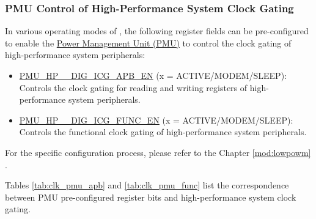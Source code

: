 \documentclass[main\_\_EN.tex]{subfiles}
\begin{document}
\subsubsection{PMU Control of High-Performance System Clock Gating}
In various operating modes of \chipname{}, the following register fields can be pre-configured to enable the \hyperref[mod:lowpowm]{Power Management Unit (PMU)} to control the clock gating of high-performance system peripherals:

\begin{itemize}
    \item \hyperref[fielddesc:PMUHPACTIVEDIGICGAPBEN]{PMU\_HP\_\_DIG\_ICG\_APB\_EN} (x = ACTIVE/MODEM/SLEEP): Controls the clock gating for reading and writing registers of high-performance system peripherals.
    \item \hyperref[fielddesc:PMUHPACTIVEDIGICGFUNCEN]{PMU\_HP\_\_DIG\_ICG\_FUNC\_EN} (x = ACTIVE/MODEM/SLEEP): Controls the functional clock gating of high-performance system peripherals.
\end{itemize}

For the specific configuration process, please refer to the Chapter \ref{mod:lowpowm} \textit{}.

Tables \ref{tab:clk_pmu_apb} and \ref{tab:clk_pmu_func} list the correspondence between PMU pre-configured register bits and high-performance system clock gating.
\end{document}
